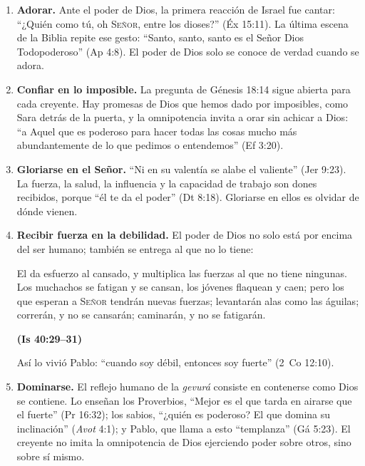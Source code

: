 \documentclass[11pt,letterpaper]{article}
\newcommand{\SENOR}{\textsc{Señor}}
\newcommand{\fuente}[1]{\par\hfill{\upshape\bfseries\small\textcolor{azul}{#1}}}
\begin{document}
\begin{enumerate}
\item \textbf{Adorar.} Ante el poder de Dios, la primera reacción de Israel fue cantar: ``¿Quién como tú, oh \SENOR, entre los dioses?'' (Éx 15:11). La última escena de la Biblia repite ese gesto: ``Santo, santo, santo es el Señor Dios Todopoderoso'' (Ap 4:8). El poder de Dios solo se conoce de verdad cuando se adora.

\item \textbf{Confiar en lo imposible.} La pregunta de Génesis 18:14 sigue abierta para cada creyente. Hay promesas de Dios que hemos dado por imposibles, como Sara detrás de la puerta, y la omnipotencia invita a orar sin achicar a Dios: ``a Aquel que es poderoso para hacer todas las cosas mucho más abundantemente de lo que pedimos o entendemos'' (Ef 3:20).

\item \textbf{Gloriarse en el Señor.} ``Ni en su valentía se alabe el valiente'' (Jer 9:23). La fuerza, la salud, la influencia y la capacidad de trabajo son dones recibidos, porque ``él te da el poder'' (Dt 8:18). Gloriarse en ellos es olvidar de dónde vienen.

\item \textbf{Recibir fuerza en la debilidad.} El poder de Dios no solo está por encima del ser humano; también se entrega al que no lo tiene:

\begin{cita}El da esfuerzo al cansado, y multiplica las fuerzas al que no tiene ningunas. Los muchachos se fatigan y se cansan, los jóvenes flaquean y caen; pero los que esperan a \SENOR{} tendrán nuevas fuerzas; levantarán alas como las águilas; correrán, y no se cansarán; caminarán, y no se fatigarán.\fuente{(Is 40:29--31)}\end{cita}

Así lo vivió Pablo: ``cuando soy débil, entonces soy fuerte'' (2~Co 12:10).

\item \textbf{Dominarse.} El reflejo humano de la \emph{gevurá} consiste en contenerse como Dios se contiene. Lo enseñan los Proverbios, ``Mejor es el que tarda en airarse que el fuerte'' (Pr 16:32); los sabios, ``¿quién es poderoso? El que domina su inclinación'' (\emph{Avot} 4:1); y Pablo, que llama a esto ``templanza'' (Gá 5:23). El creyente no imita la omnipotencia de Dios ejerciendo poder sobre otros, sino sobre sí mismo.
\end{enumerate}
\end{document}
